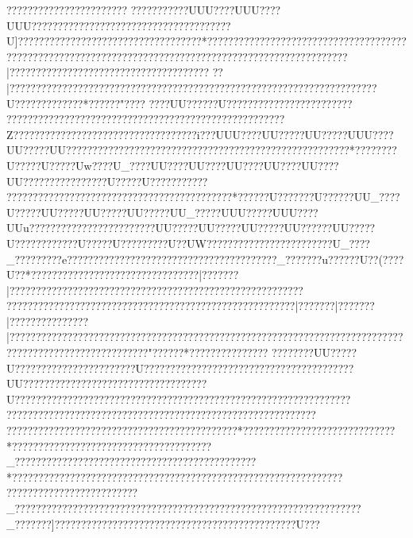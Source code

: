 {{{{{{{{{{{{{{{{{{{{{{{{{{{{{{{{{{{{{{{{{{{{{{{{{{{{{{{{{{{{{{{{{{{{{{{{{{{{{{{{{{{{{{{{{{{{{{{{{{{{{{{{{{{{{{{{{{{{{{{{{{{{{{{{{{{{{{{{{{{{{{{{{{{{{{{{{{{{{{{{{{{{{{{{{{{{{{{{{{{{{{{{{{{{{{{{{{{{{{{{{{{{{{{{{{{{{{{{{{{{{{{{{{{{{{{{{{{{{{{{{{{{{{{{{{{{{{{{{{{{{{{{{{{{{{{{{{{{{{{{{{{{{{{{{{{{{{{{{{{{{{{{{{{{{{{{{{{{{{{{{{{{{{{{{{{{{{{{{{{{{{{{{{{{{{{{{{{{{{{{{{{{{{{{{{{{{{{{{{{{{{{{{{{{{{{{{{{{{{{{{{{{{{{{{{{{{{{{{{{{{{{{{{{{{{{{{{{{{{{{{{{{{{{{{{{{{{{{{{{{{{{{{{{{{{{{{{{{{{{{{{{{{{{{{{{{{{{{{{{{{{{{{{{{{{{{{{{{{{{{{{{{{{{{{{{{{{{{{{{{{{{{{{{{{{{{{{{{{{{{{{{{{{{{{{{{{{{{{{{{{{{{{{{{{{{{{{{{{{{{{{{{{{{{{{{{{{{{{{{{{{{{{{{{{{{{{{{{{{{{{{{{{{{{{{{{{{{{{{{{{{{{{{{{{{{{{{{{{{{{{{{{{{{{{{{{{{{{{{{{{{{{{{{{{{{{{{{{{{{{{{{{{{{{{{{{{{{{{{{{{{{{{{{{{{{{{{{{{{{{{{{{{{{{{{{{{{{{{{{{{{{{{{{{{{{{{{{{{{{{{{{{{{{{{{{{{{{{{{{{{{{{{{{{{{{{{{{{{{{{{{{{{{{{{{{{{{{{{{{{{{{{{{{{{{{{{{{{{{{{{{{{{{{{{{{{{{{{{{{{{{{{{{{{{{{{{{{{{{{{{{{{{{{{{{{{{{{{{{{{{{{{{{{{{{{{{{{{{{{{{{{{{{{{{{{{{{{{{{{{{{{{{{{{{{{{{{{{{{{{{{{{{{{{{{{{{{{{{{{{{{{{{{{{{{{{{{{{{{{{{{{{{{{{{{{{{{{{{{{{{{{{{{{{{{{{{{{{{{{{{{{{{{{{{{{{{{{{{{{{{{{{{{{{{{{{{{{{{{{{{{{{{{{{{{{{{{{{{{{{{{{{{{{{{{{{{{{{{{{{{{{{{{{{{{{{{{{{{{{{{{{{{{{{{{{{{{{{{{{{{{{{{{{{{{{{{{{{{{{{{{{{{{{{{{{{{{{{{{{{{{{{{{{{{{{{{{{{{{{ ??????  ?????????????   ????
   ???????????UUU????UUU????UUU?????   ?????   ????????????????????????????U]???????? ????????????????{???????????*??????????????????{???????????????{?????????????????????????????{???? {?????????????  ????????????????????????|??????????????????????????????????????
??|???????????????{?????{???????{???????{???????{?????????????{?????{?????{??????U??{???????{????*??????" ??{??
  ????UU??????U????????????????????????????????????????????????????{???????????????{??????????Z????   ???????????????????????????????i???UUU????UU?????UU?????UUU????UU?????UU??????  ?????? ??????? ?????????????? ??????? ?????  ???? ????? *????  ????U?????U?????Uw????U_????UU????UU????UU????UU????UU????UU????  ????  ????  ????U?????U???????????????? ????? ????? ????? ????? ????? ????????????? *??????U???????U??????UU_????U?????UU?????UU?????UU?????UU_?????UUU?????UUU????UUu????????????????????????UU?????UU?????UU?????UU??????UU?????U????????????U?????U?????????U??UW????????????????????????U_????_?????????e????    ?????   ??????  ??????? ??????? ??????? ????_???????u??????U??(????U??*????????????????????????????????|???????|??????????????????????????? ?????????????????????????????
?????????????{???????{???? ??????????{?????{???????{?????????|???????|???????|???????????????|?????????????????????????????????????????????????????????????????????{?????{????????????????????????????"??????* ???????????????
??? ?????UU?????U??????????????  ?????  ????U?????  ???? ???????????????????????????????UU???????????????????????????????????U?????}???????????????????????????????????????????????????????????
????? ??????????????????????????????????????????????????????????????????????????????????????????????????*?????????????????????????????*?????????? ????? ???????????????????????_?? ????????????????????????????????????????????*??????????????????????????????????????????????????????????????? 
????????????? ??????  ??????_???????  ?????? ???????  ??????????????????????????????????????????????_???????]??????????????????????????????????????????????U???}}}}}}}}}}}}}}}}}}}}}}}}}}}}}}}}}}}}}}}}}}}}}}}}}}}}}}}}}}}}}}}}}}}}}}}}}}}}}}}}}}}}}}}}}}}}}}}}}}}}}}}}}}}}}}}}}}}}}}}}}}}}}}}}}}}}}}}}}}}}}}}}}}}}}}}}}}}}}}}}}}}}}}}}}}}}}}}}}}}}}}}}}}}}}}}}}}}}}}}}}}}}}}}}}}}}}}}}}}}}}}}}}}}}}}}}}}}}}}}}}}}}}}}}}}}}}}}}}}}}}}}}}}}}}}}}}}}}}}}}}}}}}}}}}}}}}}}}}}}}}}}}}}}}}}}}}}}}}}}}}}}}}}}}}}}}}}}}}}}}}}}}}}}}}}}}}}}}}}}}}}}}}}}}}}}}}}}}}}}}}}}}}}}}}}}}}}}}}}}}}}}}}}}}}}}}}}}}}}}}}}}}}}}}}}}}}}}}}}}}}}}}}}}}}}}}}}}}}}}}}}}}}}}}}}}}}}}}}}}}}}}}}}}}}}}}}}}}}}}}}}}}}}}}}}}}}}}}}}}}}}}}}}}}}}}}}}}}}}}}}}}}}}}}}}}}}}}}}}}}}}}}}}}}}}}}}}}}}}}}}}}}}}}}}}}}}}}}}}}}}}}}}}}}}}}}}}}}}}}}}}}}}}}}}}}}}}}}}}}}}}}}}}}}}}}}}}}}}}}}}}}}}}}}}}}}}}}}}}}}}}}}}}}}}}}}}}}}}}}}}}}}}}}}}}}}}}}}}}}}}}}}}}}}}}}}}}}}}}}}}}}}}}}}}}}}}}}}}}}}}}}}}}}}}}}}}}}}}}}}}}}}}}}}}}}}}}}}}}}}}}}}}}}}}}}}}}}}}}}}}}}}}}}}}}}}}}}}}}}}}}}}}}}}}}}}}}}}}}}}}}}}}}}}}}}}}}}}}}}}}}}}}}}}}}}}}}}}}}}}}}}}}}}}}}}}}}}}}}}}}}}}}}}}}}}}}}}}}}}}}}}}}}}}}}}}}}}}}}}}}}}}}}}}}}}}}}}}}}}}}}}}}}}}}}}}}}}}}}}}}}}}}}}}}}}}}}}}}}}}}}}}}}}}}}}}}}}}}}}}}}}}}}}}}}}}}}}}}}}}}}}}}}}}}}}}}}}}}}}}}}}}}}}}}}}}}}}}}}}}}}}}}}}}}}}}}}}}}}}}}}}}}}}}}}}}}}}}}}}}}}}}}}}}}}}}}}}}}}}}}}}}}}}}}}}}}}}}}}}}}}}}}}}}}}}}}}}}}}}}}}}}}}}}}}}}}}}}}}}}}}}}}}}}}}}}}}}}}}}}}}}}}}}}}}}}}}}}}}}}}}}}}}}}}}}}}}}}}}}}}}}
